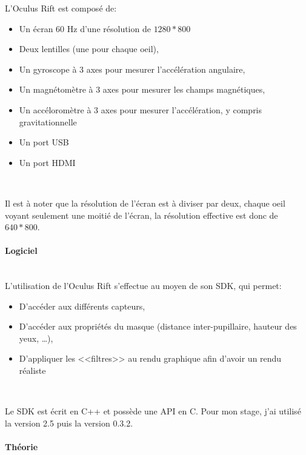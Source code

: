 \documentclass[a4paper,french,12pt]{article}
\begin{document}
				L'Oculus Rift est composé de:\\
			      
				\begin{itemize}
				\item Un écran 60 Hz d'une résolution de $1280*800$
				\item Deux lentilles (une pour chaque oeil),
				\item Un gyroscope à 3 axes pour mesurer l'accélération angulaire,
				\item Un magnétomètre à 3 axes pour mesurer les champs magnétiques,
				\item Un accéloromètre à 3 axes pour mesurer l'accélération, y compris gravitationnelle
				\item Un port USB
				\item Un port HDMI
				\end{itemize} ~
			       
				Il est à noter que la résolution de l'écran est à diviser par deux, chaque oeil voyant seulement
				une moitié de l'écran, la résolution effective est donc de $640*800$.
		    
			\paragraph{Logiciel} ~\\
			  
			    L'utilisation de l'Oculus Rift s'effectue au moyen de son SDK, qui permet:\\
			    
			    \begin{itemize}
			     \item D'accéder aux différents capteurs,
			     \item D'accéder aux propriétés du masque (distance inter-pupillaire, hauteur des yeux, \ldots),
			     \item D'appliquer les <<filtres>> au rendu graphique afin d'avoir un rendu réaliste
			    \end{itemize} ~
			    
			    Le SDK est écrit en C++ et possède une API en C.
			    Pour mon stage, j'ai utilisé la version 2.5 puis la version 0.3.2.
			
			\paragraph{Théorie} ~\\
			
\end{document}

